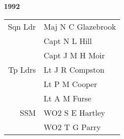 \begin{center}
  \Huge
  \textbf{1992}
\end{center}

\begin{center}
  \small
  \begin{tabular}{rl}
    Sqn Ldr & Maj N C Glazebrook \\
      & Capt N L Hill \\
      & Capt J M H Moir \\
    Tp Ldrs & Lt J R Compston \\
      & Lt P M Cooper \\
      & Lt A M Furse \\
    SSM & WO2 S E Hartley \\
      & WO2 T G Parry \\
  \end{tabular}
\end{center}

